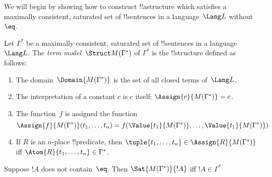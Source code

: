 \documentclass[../../include/open-logic-section]{subfiles}
\begin{document}


We will begin by showing how to construct !!a{structure} which
satisfies a maximally consistent, saturated set of !!{sentence}s in a
language~$\Lang L$ without~$\eq$.

\begin{defn}
Let $\Gamma^*$ be a maximally consistent, saturated set of !!{sentence}s
in a language~$\Lang L$.  The \emph{term model}~$\Struct M(\Gamma^*)$
of $\Gamma^*$ is the !!{structure} defined as follows:
\begin{enumerate}
\item The domain~$\Domain{M(\Gamma^*)}$ is the set of all closed terms
  of~$\Lang L$.
\item The interpretation of a constant $c$ is $c$ itself:
  $\Assign{c}{M(\Gamma^*)} = c$.
\item The function~$f$ is assigned the function
\[
\Assign{f}{M(\Gamma^*)}(t_1, \dots, t_n) = f(\Value{t_1}{M(\Gamma^*)},
\dots, \Value{t_1}{M(\Gamma^*)})
\]
\item If $R$ is an $n$-place !!{predicate}, then $\tuple{t_1, \dots,
  t_n} \in \Assign{R}{M(\Gamma^*)}$ iff $\Atom{R}{t_1, \dots,
    t_n} \in \Gamma^*$.
\end{enumerate}
\end{defn}

\begin{lem}
Suppose $!A$ does not contain~$\eq$. Then
$\Sat{M(\Gamma^*)}{!A}$ iff $!A \in \Gamma^*$
\end{lem}
\end{document}
